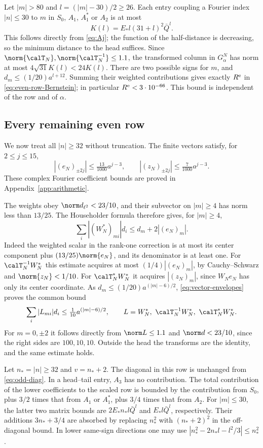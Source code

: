 Let $|m|>80$ and $l=(|m|-30)/2\ge26$. Each entry coupling a Fourier index $|n|\le30$ to $m$ in $S_0$, $A_1$, $A_1^*$ or $A_2$ is at most
\[
 K(l)=E_*l(31+l)^2\bar Q^l.
\]
This follows directly from \eqref{eq:Aj}; the function of the half-distance is decreasing, so the minimum distance to the head suffices. Since $\norm{\calT_N},\norm{\calT_N^{-1}}\le1.1$, the transformed column in $G_\alpha^N$ has norm at most $4\sqrt{31}K(l)<24K(l)$. There are two possible signs for $m$, and $d_m\le(1/20)a^{l+12}$. Summing their weighted contributions gives exactly $R^{\rm e}$ in \eqref{eq:even-row-Bernstein}; in particular $R^{\rm e}<3\cdot10^{-66}$. This bound is independent of the row and of $\alpha$.

\subsection{Every remaining even row}
We now treat all $|n|\ge32$ without truncation. The finite vectors satisfy, for $2\le j\le15$,
\begin{equation}\label{eq:vector-envelopes}
 |(e_N)_{\pm2j}|\le\tfrac{13}{1000}a^{j-3},\qquad
 |(z_N)_{\pm2j}|\le\tfrac7{1000}a^{j-3}.
\end{equation}
These complex Fourier coefficient bounds are proved in Appendix~\ref{app:arithmetic}.

The weights obey $\norm d_{\ell^2}<23/10$, and their subvector on $|m|\ge4$ has norm less than $13/25$. The Householder formula therefore gives, for $|m|\ge4$,
\[
 \sum_i|(W_N^*)_{mi}|d_i\le d_m+2|(e_N)_m|.
\]
Indeed the weighted scalar in the rank-one correction is at most its center component plus $(13/25)\norm{e_N}$, and its denominator is at least one. For $\calT_N^{-1}W_N^*$ this estimate acquires at most $(1/4)|(e_N)_m|$, by Cauchy--Schwarz and $\norm{z_N}<1/10$. For $\calT_N^*W_N^*$ it acquires $|(z_N)_m|$, since $W_Ne_N$ has only its center coordinate. As $d_m\le(1/20)a^{(|m|-6)/2}$, \eqref{eq:vector-envelopes} proves the common bound
\begin{equation}\label{eq:transform-envelope}
 \sum_i|L_{mi}|d_i\le\tfrac1{10}a^{(|m|-6)/2},
 \qquad L=W_N^*,\ \calT_N^{-1}W_N^*,\ \calT_N^*W_N^*.
\end{equation}
For $m=0,\pm2$ it follows directly from $\norm L\le1.1$ and $\norm d<23/10$, since the right sides are $100,10,10$. Outside the head the transforms are the identity, and the same estimate holds.

Let $n_*=|n|\ge32$ and $v=n_*+2$. The diagonal in this row is unchanged from \eqref{eq:odd-diag}. In a head--tail entry, $A_3$ has no contribution. The total contribution of the lower coefficients to the scaled row is bounded by the contribution from $S_0$, plus $3/2$ times that from $A_1$ or $A_1^*$, plus $3/4$ times that from $A_2$. For $|m|\le30$, the latter two matrix bounds are $2E_*n_*l\bar Q^l$ and $E_*l\bar Q^l$, respectively. Their additions $3n_*+3/4$ are absorbed by replacing $n_*^2$ with $(n_*+2)^2$ in the off-diagonal bound. In lower same-sign directions one may use $|n_*^2-2n_*l-l^2/3|\le n_*^2$.

